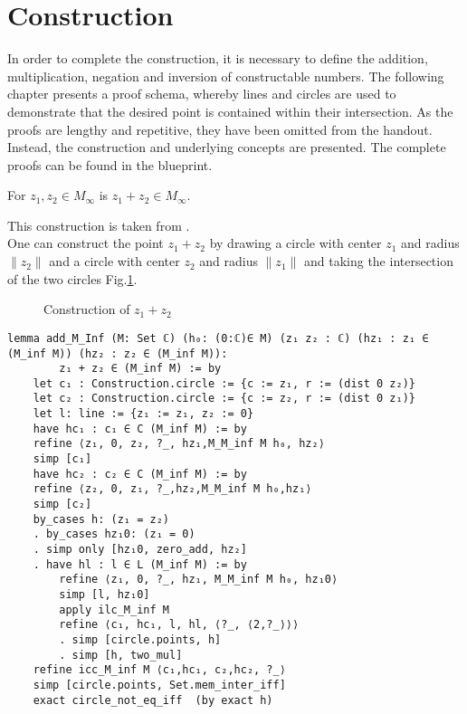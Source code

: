 \section{Construction}
In order to complete the construction, it is necessary to define the addition, multiplication, negation and inversion of constructable numbers.
The following chapter presents a proof schema, whereby lines and circles are used to demonstrate that the desired point is contained within their intersection. As the proofs are lengthy and repetitive, they have been omitted from the handout. Instead, the construction and underlying concepts are presented.
The complete proofs can be found in the blueprint.

\begin{lemma}
    \label{lem:construction_add}
    For $z_1, z_2 \in M_{\infty}$ is $z_1 + z_2 \in M_{\infty}$.
\end{lemma}
This construction is taken from \cite{JAN_SCHROEER:2023}.\\
One can construct the point $z_1 + z_2$ by drawing a circle with center $z_1$ and radius $\|z_2\|$ and a circle with center $z_2$ and radius $\|z_1\|$ and taking the intersection of the two circles Fig.\ref{Fig.2}.

\begin{figure}[h!]
    \centering
    \caption{Construction of $z_1 + z_2$}
    \label{Fig.2}
\end{figure}

\begin{lstlisting}
lemma add_M_Inf (M: Set ℂ) (h₀: (0:ℂ)∈ M) (z₁ z₂ : ℂ) (hz₁ : z₁ ∈ (M_inf M)) (hz₂ : z₂ ∈ (M_inf M)):
        z₁ + z₂ ∈ (M_inf M) := by
    let c₁ : Construction.circle := {c := z₁, r := (dist 0 z₂)}
    let c₂ : Construction.circle := {c := z₂, r := (dist 0 z₁)}
    let l: line := {z₁ := z₁, z₂ := 0}
    have hc₁ : c₁ ∈ C (M_inf M) := by
    refine ⟨z₁, 0, z₂, ?_, hz₁,M_M_inf M h₀, hz₂⟩
    simp [c₁]
    have hc₂ : c₂ ∈ C (M_inf M) := by
    refine ⟨z₂, 0, z₁, ?_,hz₂,M_M_inf M h₀,hz₁⟩
    simp [c₂]
    by_cases h: (z₁ = z₂)
    . by_cases hz₁0: (z₁ = 0)
    . simp only [hz₁0, zero_add, hz₂]
    . have hl : l ∈ L (M_inf M) := by
        refine ⟨z₁, 0, ?_, hz₁, M_M_inf M h₀, hz₁0⟩
        simp [l, hz₁0]
        apply ilc_M_inf M
        refine ⟨c₁, hc₁, l, hl, ⟨?_, ⟨2,?_⟩⟩⟩
        . simp [circle.points, h]
        . simp [h, two_mul]
    refine icc_M_inf M ⟨c₁,hc₁, c₂,hc₂, ?_⟩
    simp [circle.points, Set.mem_inter_iff]
    exact circle_not_eq_iff  (by exact h)
\end{lstlisting}

